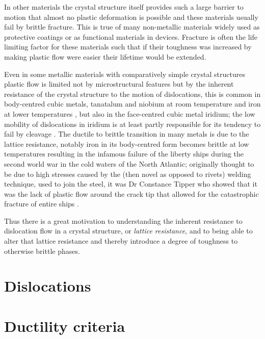 In other materials the crystal structure itself provides such a large barrier to motion that almost no plastic deformation is possible and these materials usually fail by brittle fracture. This is true of many non-metallic materials widely used as protective coatings or as functional materials in devices. Fracture is often the life limiting factor for these materials such that if their toughness was increased by making plastic flow were easier their lifetime would be extended. 

Even in some metallic materials with comparatively simple crystal structures plastic flow is limited not by microstructural features but by the inherent resistance of the crystal structure to the motion of dislocations, this is common in body-centred cubic metals, tanatalum and niobium at room temperature and iron at lower temperatures \cite{Christian1983,Weinberger2013}, but also in the face-centred cubic metal iridium; the low mobility of dislocations in iridium is at least partly responsible for its tendency to fail by cleavage \cite{Panfilov2001}. The ductile to brittle transition in many metals is due to the lattice resistance, notably iron in its body-centred form becomes brittle at low temperatures resulting in the infamous failure of the liberty ships during the second world war in the cold waters of the North Atlantic; originally thought to be due to high stresses caused by the (then novel as opposed to rivets) welding technique, used to join the steel, it was Dr Constance Tipper who showed that it was the lack of plastic flow around the crack tip that allowed for the catastrophic fracture of entire ships \cite{Cottrell1997}. 

Thus there is a great motivation to understanding the inherent resistance to dislocation flow in a crystal structure, or \emph{lattice resistance}, and to being able to alter that lattice resistance and thereby introduce a degree of toughness to otherwise brittle phases.



\section{Dislocations}  
\label{sec:dislocations}



\section{Ductility criteria}
\label{sec:ductility_criteria}

